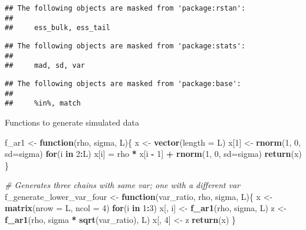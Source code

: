 \documentclass[
]{article}
\newenvironment{Shaded}{\begin{snugshade}}{\end{snugshade}}
\newcommand{\AttributeTok}[1]{\textcolor[rgb]{0.13,0.29,0.53}{#1}}
\newcommand{\CommentTok}[1]{\textcolor[rgb]{0.56,0.35,0.01}{\textit{#1}}}
\newcommand{\ControlFlowTok}[1]{\textcolor[rgb]{0.13,0.29,0.53}{\textbf{#1}}}
\newcommand{\DecValTok}[1]{\textcolor[rgb]{0.00,0.00,0.81}{#1}}
\newcommand{\FunctionTok}[1]{\textcolor[rgb]{0.13,0.29,0.53}{\textbf{#1}}}
\newcommand{\NormalTok}[1]{#1}
\newcommand{\OtherTok}[1]{\textcolor[rgb]{0.56,0.35,0.01}{#1}}
\newcommand{\SpecialCharTok}[1]{\textcolor[rgb]{0.81,0.36,0.00}{\textbf{#1}}}
\begin{document}
\begin{verbatim}
## The following objects are masked from 'package:rstan':
## 
##     ess_bulk, ess_tail
\end{verbatim}

\begin{verbatim}
## The following objects are masked from 'package:stats':
## 
##     mad, sd, var
\end{verbatim}

\begin{verbatim}
## The following objects are masked from 'package:base':
## 
##     %in%, match
\end{verbatim}

Functions to generate simulated data

\begin{Shaded}
\begin{Highlighting}[]
\NormalTok{f\_ar1 }\OtherTok{\textless{}{-}} \ControlFlowTok{function}\NormalTok{(rho, sigma, L)\{}
\NormalTok{  x }\OtherTok{\textless{}{-}} \FunctionTok{vector}\NormalTok{(}\AttributeTok{length =}\NormalTok{ L)}
\NormalTok{  x[}\DecValTok{1}\NormalTok{] }\OtherTok{\textless{}{-}} \FunctionTok{rnorm}\NormalTok{(}\DecValTok{1}\NormalTok{, }\DecValTok{0}\NormalTok{, }\AttributeTok{sd=}\NormalTok{sigma)}
  \ControlFlowTok{for}\NormalTok{(i }\ControlFlowTok{in} \DecValTok{2}\SpecialCharTok{:}\NormalTok{L)}
\NormalTok{    x[i] }\OtherTok{=}\NormalTok{ rho }\SpecialCharTok{*}\NormalTok{ x[i }\SpecialCharTok{{-}} \DecValTok{1}\NormalTok{] }\SpecialCharTok{+} \FunctionTok{rnorm}\NormalTok{(}\DecValTok{1}\NormalTok{, }\DecValTok{0}\NormalTok{, }\AttributeTok{sd=}\NormalTok{sigma)}
  \FunctionTok{return}\NormalTok{(x)}
\NormalTok{\}}

\CommentTok{\# Generates three chains with same var; one with a different var}
\NormalTok{f\_generate\_lower\_var\_four }\OtherTok{\textless{}{-}} \ControlFlowTok{function}\NormalTok{(var\_ratio, rho, sigma, L)\{}
\NormalTok{  x }\OtherTok{\textless{}{-}} \FunctionTok{matrix}\NormalTok{(}\AttributeTok{nrow =}\NormalTok{ L, }\AttributeTok{ncol =} \DecValTok{4}\NormalTok{)}
  \ControlFlowTok{for}\NormalTok{(i }\ControlFlowTok{in} \DecValTok{1}\SpecialCharTok{:}\DecValTok{3}\NormalTok{)}
\NormalTok{    x[, i] }\OtherTok{\textless{}{-}} \FunctionTok{f\_ar1}\NormalTok{(rho, sigma, L)}
\NormalTok{  z }\OtherTok{\textless{}{-}} \FunctionTok{f\_ar1}\NormalTok{(rho, sigma }\SpecialCharTok{*} \FunctionTok{sqrt}\NormalTok{(var\_ratio), L)}
\NormalTok{  x[, }\DecValTok{4}\NormalTok{] }\OtherTok{\textless{}{-}}\NormalTok{ z}
  \FunctionTok{return}\NormalTok{(x)}
\NormalTok{\}}
\end{Highlighting}
\end{Shaded}
\end{document}

